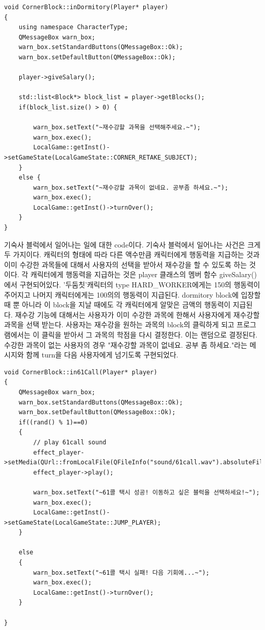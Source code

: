 \documentclass[10pt,oneside,a4paper,titlepage]{article}
\begin{document}
\begin{lstlisting}[escapeinside=~~]
void CornerBlock::inDormitory(Player* player) 
{
    using namespace CharacterType;
    QMessageBox warn_box;
    warn_box.setStandardButtons(QMessageBox::Ok);
    warn_box.setDefaultButton(QMessageBox::Ok);

    player->giveSalary();

    std::list<Block*> block_list = player->getBlocks();
    if(block_list.size() > 0) {

        warn_box.setText("~재수강할 과목을 선택해주세요.~");
        warn_box.exec();
        LocalGame::getInst()->setGameState(LocalGameState::CORNER_RETAKE_SUBJECT);
    }
    else {
        warn_box.setText("~재수강할 과목이 없네요. 공부좀 하세요.~");
        warn_box.exec();
        LocalGame::getInst()->turnOver();
    }
}

\end{lstlisting}
기숙사 블럭에서 일어나는 일에 대한 code이다. 기숙사 블럭에서 일어나는 사건은 크게 두 가지이다. 캐릭터의 형태에 따라 다른 액수만큼 캐릭터에게 행동력을 지급하는 것과 이미 수강한 과목들에 대해서 사용자의 선택을 받아서 재수강을 할 수 있도록 하는 것이다. 
각 캐릭터에게 행동력을 지급하는 것은 player 클래스의 멤버 함수 giveSalary()에서 구현되어있다. '두둠칫'캐릭터의 type HARD\_WORKER에게는 150의 행동력이 주어지고 나머지 캐릭터에게는 100의의 행동력이 지급된다. dormitory block에 입장할 때 뿐 아니라 이 block을 지날 때에도 각 캐릭터에게 알맞은 금액의 행동력이 지급된다.
재수강 기능에 대해서는 사용자가 이미 수강한 과목에 한해서 사용자에게 재수강할 과목을 선택 받는다. 사용자는 재수강을 원하는 과목의 block의 클릭하게 되고 프로그램에서는 이 클릭을 받아서 그 과목의 학점을 다시 결정한다. 이는 랜덤으로 결정된다. 수강한 과목이 없는 사용자의 경우 "재수강할 과목이 없네요. 공부 좀 하세요."라는 메시지와 함께 turn을 다음 사용자에게 넘기도록 구현되었다. \\

\begin{lstlisting}[escapeinside=~~]
void CornerBlock::in61Call(Player* player)
{
    QMessageBox warn_box;
    warn_box.setStandardButtons(QMessageBox::Ok);
    warn_box.setDefaultButton(QMessageBox::Ok);
    if((rand() % 1)==0)
    {
        // play 61call sound
        effect_player->setMedia(QUrl::fromLocalFile(QFileInfo("sound/61call.wav").absoluteFilePath()));
        effect_player->play();

        warn_box.setText("~61콜 택시 성공! 이동하고 싶은 블럭을 선택하세요!~");
        warn_box.exec();
        LocalGame::getInst()->setGameState(LocalGameState::JUMP_PLAYER);
    }

    else
    {
        warn_box.setText("~61콜 택시 실패! 다음 기회에...~");
        warn_box.exec();
        LocalGame::getInst()->turnOver();
    }

}
\end{lstlisting}
\end{document}
